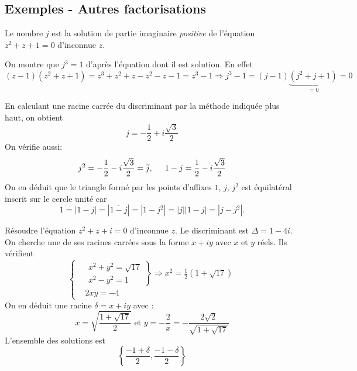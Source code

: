 \subsection{Exemples - Autres factorisations}
 
\begin{defi}[nombre $j$]
 Le nombre $j$ est la solution de partie imaginaire \emph{positive} de l'équation $z^2+z+1=0$ d'inconnue $z$.
\end{defi}
\begin{rem}
 On montre que $j^3=1$ d'après l'équation dont il est solution. 
 En effet
 \begin{displaymath}
   (z-1)(z^2+z+1)= z^3 + z^2 + z - z^2 -z - 1 = z^3 - 1 \Rightarrow j^3 - 1 = (j-1)\underset{=0}{\underbrace{(j^2+j+1)}} = 0
 \end{displaymath}

 En calculant une racine carrée du discriminant par la méthode indiquée plus haut, on obtient
\begin{displaymath}
 j = -\frac{1}{2} + i\frac{\sqrt{3}}{2}
\end{displaymath}
On vérifie aussi:
\begin{displaymath}
  j^2 = -\frac{1}{2} - i\frac{\sqrt{3}}{2} = \overline{j},\hspace{0.5cm} 1-j = \frac{1}{2} - i\frac{\sqrt{3}}{2} 
\end{displaymath}
On en déduit que le triangle formé par les points d'affixes $1$, $j$, $j^2$ est équilatéral inscrit sur le cercle unité car
\begin{displaymath}
  1 = |1-j| = |\overline{1-j}| = |1-j^2| = |j||1-j| = |j - j^2|.
\end{displaymath}

\end{rem}
\begin{exple}
 Résoudre l'équation $z^2+z+i=0$ d'inconnue $z$. \newline
Le discriminant est $\Delta = 1-4i$. On cherche une de ses racines carrées sous la forme $x+iy$ avec $x$ et $y$ réels. Ils vérifient
\begin{displaymath}
 \left\lbrace 
\begin{aligned}
  &\left. 
    \begin{aligned}
      x^2 + y^2 = \sqrt{17}\\
      x^2 - y^2 = 1
     \end{aligned}
  \right\rbrace \Rightarrow x^2=\frac{1}{2}(1+\sqrt{17}) \\
  &2xy = -4
\end{aligned}
\right. 
\end{displaymath}
On en déduit une racine $\delta = x+iy$ avec :
\begin{displaymath}
 x=\sqrt{\frac{1+\sqrt{17}}{2}}\text{ et } y =-\frac{2}{x} = -\frac{2\sqrt{2}}{\sqrt{1+\sqrt{17}}}
\end{displaymath}
L'ensemble des solutions est
\begin{displaymath}
 \left\lbrace \frac{-1+\delta}{2}, \frac{-1-\delta}{2}\right\rbrace 
\end{displaymath}
\end{exple}
